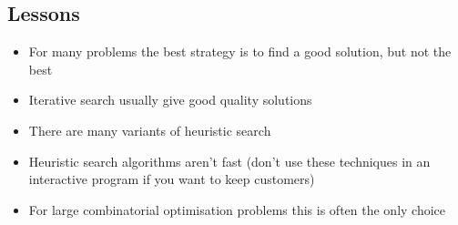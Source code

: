 
\begin{slide}
\section{Lessons}

\begin{PauseHighLight}
  \begin{itemize}
  \item For many problems the best strategy is to find a good solution,
    but not the best\pause
  \item Iterative search usually give good quality solutions\pause
  \item There are many variants of heuristic search\pause
  \item Heuristic search algorithms aren't fast (don't use these
    techniques in an interactive program if you want to keep
    customers)\pause
  \item For large combinatorial optimisation problems this is often the
    only choice\pause
  \end{itemize}
\end{PauseHighLight}


\end{slide}
